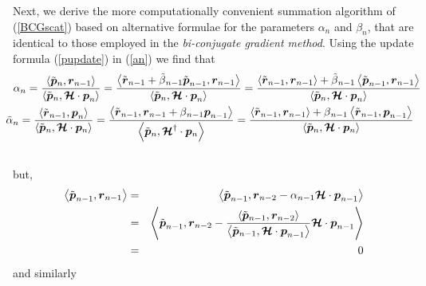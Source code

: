Next, we derive the more computationally convenient summation algorithm of 
(\ref{BCGscat}) based on 
alternative formulae for the parameters $\alpha_n$ and $\beta_n$, that 
are identical to those employed in the {\em bi-conjugate gradient method}.
Using the update formula (\ref{pupdate})
in (\ref{an}) we find that
\begin{eqnarray} \label{eq3}
\lefteqn{
{{ \alpha }}_{n}={\frac{\left\langle{\tilde{\bmi  p}{}_{n},{\bmi  
r}_{n-1}}\right\rangle}{\left\langle{\tilde{\bmi  p}{}_{n},{\CB H}
\cdot   {\bmi  p}_{n}}\right\rangle}}=
\frac{\left\langle{{\tilde{ \bmi  r}}_{ n-1}+\tilde{\beta}{}_{n-1} 
{\tilde{ \bmi  
p}}_{ n-1} ,{\bmi  r}_{n-1}}\right\rangle}{\left\langle{\tilde{\bmi  
p}{}_{n},{\CB H}
\cdot   {\bmi  p}_{n}}\right\rangle}
=
\frac{\left\langle{{\tilde{ \bmi  r}}_{ n-1},{\bmi  r}_{n-1}}\right\rangle 
+
\tilde{\beta}{}_{n-1} \left\langle  {\tilde{ \bmi  
p}}_{ n-1} ,{\bmi  r}_{n-1} \right\rangle}{\left\langle{\tilde{\bmi  
p}{}_{n},{\CB H}
\cdot   {\bmi  p}_{n}}\right\rangle}
}\nonumber\\
&& \!\!\!\!\!\!\!\!\!\!
{\tilde{ \alpha 
}}_{n}={\frac{\left\langle{\tilde{\bmi  r}{}_{n-1},{\bmi  
p}_{n} }\right\rangle}{\left\langle{\tilde{\bmi  p}{}_{n},{\CB H}
\cdot   {\bmi  p}{}_{n}}\right\rangle}}=
{\frac{\left\langle{{\tilde{ \bmi  r}}_{  n-1} 
 ,{{ \bmi  r}}_{ n-1}+{\beta}{}_{n-1} {{ \bmi  p}}_{ n-1}}\right\rangle}
 {\left\langle{\tilde{\bmi  p}{}_{n},{\CB H}^{\dagger}\cdot   {\bmi  
p}{}_{n}}\right\rangle}}
 =
{\frac{\left\langle{{\tilde{ \bmi  r}}_{  n-1} 
 ,{{ \bmi  r}}_{ n-1}}\right\rangle+{\beta}{}_{n-1}
 \left\langle{{\tilde{ \bmi  r}}_{  n-1} 
 , {{ \bmi  p}}_{ n-1}}\right\rangle}
 {\left\langle{\tilde{\bmi  p}{}_{n},{\CB H}\cdot   {\bmi  
p}{}_{n}}\right\rangle}}
\nonumber\\
&&
\end{eqnarray}
but,
\begin{eqnarray} \label{eq1}
\left\langle{{\tilde{ \mbox{\boldmath$\mit p$\unboldmath}}}_{ n-1} ,{\mbox{\boldmath$\mit r$\unboldmath}}_{n-1}}\right\rangle
&=& \left\langle{
{\tilde{ \mbox{\boldmath$\mit p$\unboldmath}}}_{ n-1} ,{\mbox{\boldmath$\mit r$\unboldmath}}_{n-2} -
{\alpha}{}_{n-1} {\mbox{\boldmath$\cal H$\unboldmath}}\cdot {{ \mbox{\boldmath$\mit p$\unboldmath}}}_{ n-1}
}\right\rangle\nonumber\\
&=& \left\langle{
{\tilde{ \mbox{\boldmath$\mit p$\unboldmath}}}_{ n-1} ,{\mbox{\boldmath$\mit r$\unboldmath}}_{n-2} -
{\frac{\left\langle{\tilde{\mbox{\boldmath$\mit p$\unboldmath}}{}_{n-1},{\mbox{\boldmath$\mit r$\unboldmath}}_{n-2}}\right\rangle}{\left\langle{\tilde{\mbox{\boldmath$\mit p$\unboldmath}}{}_{n-1},{\mbox{\boldmath$\cal H$\unboldmath}}
\cdot   {\mbox{\boldmath$\mit p$\unboldmath}}_{n-1}}\right\rangle}} {\mbox{\boldmath$\cal H$\unboldmath}}\cdot {{ \mbox{\boldmath$\mit p$\unboldmath}}}_{ n-1}
}\right\rangle\nonumber\\
&=&0
\end{eqnarray}
and similarly
